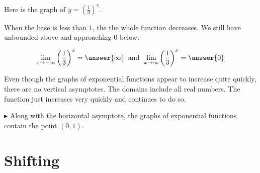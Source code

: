 \documentclass{ximera}
\begin{document}
Here is the graph of $y = \left(\frac{1}{3}\right)^x$.

\begin{image}
\end{image}


When the base is less than $1$, the the whole function decreases.  We still have unbounded above and approaching $0$ below.

\[  \lim_{x \to -\infty} \left(\frac{1}{3}\right)^x = \answer{\infty}     \, \text{ and } \,  \lim_{x \to \infty} \left(\frac{1}{3}\right)^x = \answer{0}   \]




Even though the graphs of exponential functions appear to increase quite quickly, there are no vertical asymptotes.  The domains include all real numbers.  The function just increases very quickly and continues to do so.



$\blacktriangleright$ Along with the horizontal asymptote, the graphs of exponential functions contain the point $(0, 1)$.








\section{Shifting}
\end{document}
